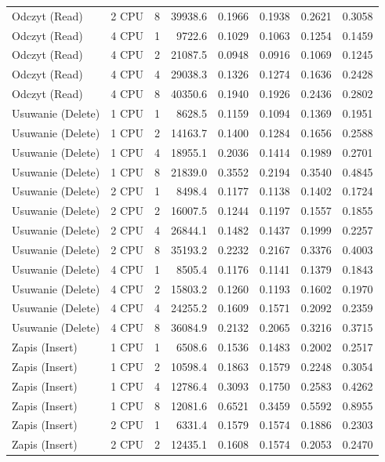 \begin{table}[ht]
{\begin{tabular}{llcrrrrr}
Odczyt (Read) & 2 CPU & 8 & 39938.6 & 0.1966 & 0.1938 & 0.2621 & 0.3058 \\
Odczyt (Read) & 4 CPU & 1 & 9722.6 & 0.1029 & 0.1063 & 0.1254 & 0.1459 \\
Odczyt (Read) & 4 CPU & 2 & 21087.5 & 0.0948 & 0.0916 & 0.1069 & 0.1245 \\
Odczyt (Read) & 4 CPU & 4 & 29038.3 & 0.1326 & 0.1274 & 0.1636 & 0.2428 \\
Odczyt (Read) & 4 CPU & 8 & 40350.6 & 0.1940 & 0.1926 & 0.2436 & 0.2802 \\
Usuwanie (Delete) & 1 CPU & 1 & 8628.5 & 0.1159 & 0.1094 & 0.1369 & 0.1951 \\
Usuwanie (Delete) & 1 CPU & 2 & 14163.7 & 0.1400 & 0.1284 & 0.1656 & 0.2588 \\
Usuwanie (Delete) & 1 CPU & 4 & 18955.1 & 0.2036 & 0.1414 & 0.1989 & 0.2701 \\
Usuwanie (Delete) & 1 CPU & 8 & 21839.0 & 0.3552 & 0.2194 & 0.3540 & 0.4845 \\
Usuwanie (Delete) & 2 CPU & 1 & 8498.4 & 0.1177 & 0.1138 & 0.1402 & 0.1724 \\
Usuwanie (Delete) & 2 CPU & 2 & 16007.5 & 0.1244 & 0.1197 & 0.1557 & 0.1855 \\
Usuwanie (Delete) & 2 CPU & 4 & 26844.1 & 0.1482 & 0.1437 & 0.1999 & 0.2257 \\
Usuwanie (Delete) & 2 CPU & 8 & 35193.2 & 0.2232 & 0.2167 & 0.3376 & 0.4003 \\
Usuwanie (Delete) & 4 CPU & 1 & 8505.4 & 0.1176 & 0.1141 & 0.1379 & 0.1843 \\
Usuwanie (Delete) & 4 CPU & 2 & 15803.2 & 0.1260 & 0.1193 & 0.1602 & 0.1970 \\
Usuwanie (Delete) & 4 CPU & 4 & 24255.2 & 0.1609 & 0.1571 & 0.2092 & 0.2359 \\
Usuwanie (Delete) & 4 CPU & 8 & 36084.9 & 0.2132 & 0.2065 & 0.3216 & 0.3715 \\
Zapis (Insert) & 1 CPU & 1 & 6508.6 & 0.1536 & 0.1483 & 0.2002 & 0.2517 \\
Zapis (Insert) & 1 CPU & 2 & 10598.4 & 0.1863 & 0.1579 & 0.2248 & 0.3054 \\
Zapis (Insert) & 1 CPU & 4 & 12786.4 & 0.3093 & 0.1750 & 0.2583 & 0.4262 \\
Zapis (Insert) & 1 CPU & 8 & 12081.6 & 0.6521 & 0.3459 & 0.5592 & 0.8955 \\
Zapis (Insert) & 2 CPU & 1 & 6331.4 & 0.1579 & 0.1574 & 0.1886 & 0.2303 \\
Zapis (Insert) & 2 CPU & 2 & 12435.1 & 0.1608 & 0.1574 & 0.2053 & 0.2470 \\

\end{tabular}}
\end{table}
